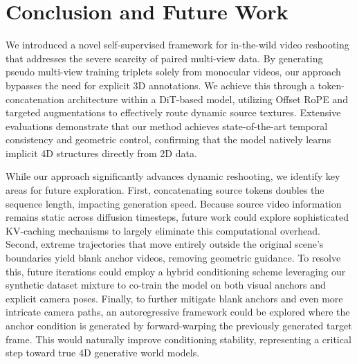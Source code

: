 \section{Conclusion and Future Work}
\label{sec:conclusion}

We introduced a novel self-supervised framework for in-the-wild video reshooting that addresses the severe scarcity of paired multi-view data. By generating pseudo multi-view training triplets solely from monocular videos, our approach bypasses the need for explicit 3D annotations. We achieve this through a token-concatenation architecture within a DiT-based model, utilizing Offset RoPE and targeted augmentations to effectively route dynamic source textures. Extensive evaluations demonstrate that our method achieves state-of-the-art temporal consistency and geometric control, confirming that the model natively learns implicit 4D structures directly from 2D data. 

While our approach significantly advances dynamic reshooting, we identify key areas for future exploration. First, concatenating source tokens doubles the sequence length, impacting generation speed. Because source video information remains static across diffusion timesteps, future work could explore sophisticated KV-caching mechanisms to largely eliminate this computational overhead. Second, extreme trajectories that move entirely outside the original scene's boundaries yield blank anchor videos, removing geometric guidance. To resolve this, future iterations could employ a hybrid conditioning scheme leveraging our synthetic dataset mixture to co-train the model on both visual anchors and explicit camera poses. Finally, to further mitigate blank anchors and even more intricate camera paths, an autoregressive framework could be explored where the anchor condition is generated by forward-warping the previously generated target frame. This would naturally improve conditioning stability, representing a critical step toward true 4D generative world models.